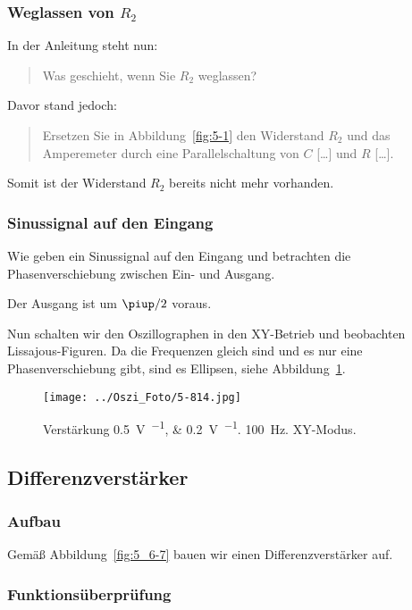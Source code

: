 \subsubsection{Weglassen von $R_2$}

In der Anleitung steht nun:

\begin{quote}
	Was geschieht, wenn Sie $R_2$ weglassen?
\end{quote}

Davor stand jedoch:

\begin{quote}
	Ersetzen Sie in Abbildung~\ref{fig:5-1} den Widerstand $R_2$ und das
	Amperemeter durch eine Parallelschaltung von $C$ […] und $R$ […].
\end{quote}

Somit ist der Widerstand $R_2$ bereits nicht mehr vorhanden.

\subsubsection{Sinussignal auf den Eingang}

Wie geben ein Sinussignal auf den Eingang und betrachten die Phasenverschiebung
zwischen Ein- und Ausgang.

Der Ausgang ist um $\piup/2$ voraus.

Nun schalten wir den Oszillographen in den XY-Betrieb und beobachten
Lissajous-Figuren. Da die Frequenzen gleich sind und es nur eine
Phasenverschiebung gibt, sind es Ellipsen, siehe Abbildung~\ref{fig:814}.

\begin{figure}[htbp]
	\centering
	\texttt{[image: ../Oszi\_Foto/5-814.jpg]}
	\caption{%
		Verstärkung \SIlist{.5;.2}{\volt\per\division}. \SI{100}{\hertz}.
		XY-Modus.
	}
	\label{fig:814}
\end{figure}

\FloatBarrier
\subsection{Differenzverstärker}

\subsubsection{Aufbau}

Gemäß Abbildung~\ref{fig:5_6-7} bauen wir einen Differenzverstärker auf.

\subsubsection{Funktionsüberprüfung}

